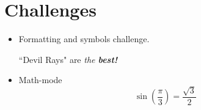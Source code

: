 \section{Challenges}

\begin{itemize}
    \item Formatting and symbols challenge.
    \begin{center}
        {\Large ``Devil Rays"} are \textit {the {\textbf{best!}}} {\Smiley} {\frownie}
\end{center}

    \item Math-mode
$$
\sin(\frac{\pi}3)=\frac{\sqrt{3}}2
$$

\end{itemize}
